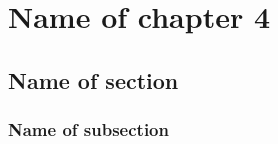

\graphicspath{{4/figures/}} %


\chapter{\label{ch4}Name of chapter 4} %

\section{\label{4:1}Name of section}

\subsection{\label{4:1:1}Name of subsection}




